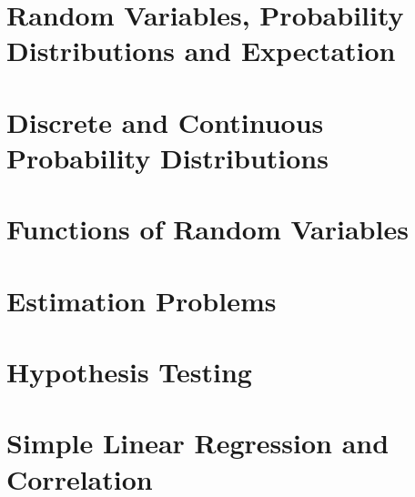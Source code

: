 \documentclass[11pt]{article}
\begin{document}
\pagebreak

\section{Random Variables, Probability Distributions and Expectation}
\section{Discrete and Continuous Probability Distributions}
\section{Functions of Random Variables}
\section{Estimation Problems}
\section{Hypothesis Testing}
\section{Simple Linear Regression and Correlation}
\end{document}
